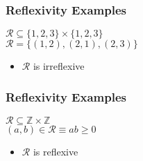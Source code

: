\documentclass[dvipsnames]{beamer}
\begin{document}
\begin{frame}
  \frametitle{Reflexivity Examples}

  \begin{example}
    $\mathcal{R} \subseteq \{1,2,3\} \times \{1,2,3\}$\\
    $\mathcal{R} = \{(1,2), (2,1), (2,3)\}$

    \medskip
    \begin{itemize}
      \item $\mathcal{R}$ is irreflexive
    \end{itemize}
  \end{example}
\end{frame}

\begin{frame}
  \frametitle{Reflexivity Examples}

  \begin{example}
    $\mathcal{R} \subseteq \mathbb{Z} \times \mathbb{Z}$\\
    $(a,b) \in \mathcal{R} \equiv ab \geq 0$

    \medskip
    \begin{itemize}
      \item $\mathcal{R}$ is reflexive
    \end{itemize}
  \end{example}
\end{frame}
\end{document}
